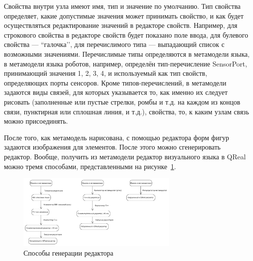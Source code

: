 \documentclass[a4paper]{article}
\begin{document}
Свойства внутри узла имеют имя, тип и значение по умолчанию. Тип свойства определяет, какие допустимые значения может принимать свойство, и как будет осуществляться редактирование значений в редакторе свойств. Например, для строкового свойства в редакторе свойств будет показано поле ввода, для булевого свойства --- ``галочка’’, для перечислимого типа --- выпадающий список с возможными значениями. Перечислимые типы определяются в метамодели языка, в метамодели языка роботов, например, определён тип-перечисление SensorPort, принимающий значения 1, 2, 3, 4, и используемый как тип свойств, определяющих порты сенсоров. Кроме типов-перечислений, в метамодели задаются виды связей, для которых указывается то, как именно их следует рисовать (заполненные или пустые стрелки, ромбы и т.д. на каждом из концов связи, пунктирная или сплошная линия, и т.д.), свойства, то, к каким узлам связь можно присоединять.

После того, как метамодель нарисована, с помощью редактора форм фигур задаются изображения для элементов. После этого можно сгенерировать редактор. Вообще, получить из метамодели редактор визуального языка в QReal можно тремя способами, представленными на рисунке~\ref{editorGeneration}.

\begin{figure} [ht]
  \begin{center}
    \includegraphics[width=0.7\textwidth]{editorGeneration.png}
    \caption{Способы генерации редактора}
    \label{editorGeneration}
  \end{center}
\end{figure}
\end{document}
